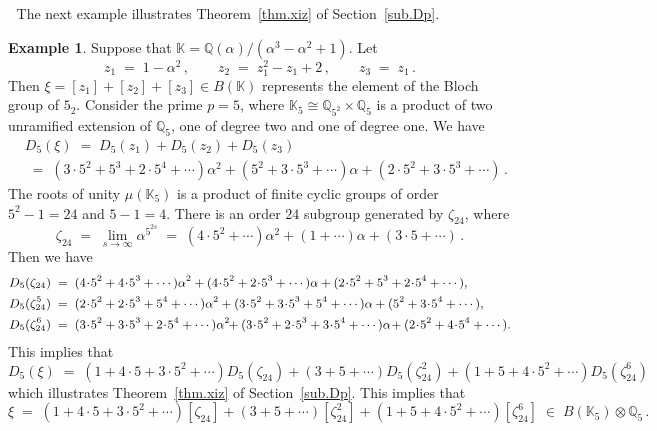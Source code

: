 \documentclass[12pt,reqno]{amsart}
\theoremstyle{definition}
\newtheorem{example}[proposition]{Example}
\def\BQ{\mathbb Q}
\def\BK{\mathbb K}
\def\a{\alpha}
\def\be{\begin{equation}}
\def\ee{\end{equation}}
\def\z{\zeta}
\def\={\;=\;}
\def\inn{\;\in\;}
\begin{document}
$\;$ The next example illustrates Theorem~\ref{thm.xiz} of Section~\ref{sub.Dp}.

\begin{example}
\label{ex.xiz1}
Suppose that $\mathbb{K}=\BQ(\alpha)/(\alpha^3-\alpha^2+1)$. Let
\be
z_1\=1-\alpha^2\,,\qquad
z_2\=z_1^2-z_1+2\,,\qquad
z_3\=z_1\,.
\ee
Then $\xi=[z_1]+[z_2]+[z_3]\in B(\mathbb{K})$ represents the element of the Bloch
group of $5_2$. Consider the prime $p=5$, where
$\mathbb{K}_{5}\cong\BQ_{5^2}\times\BQ_{5}$ is a product of two unramified extension
of $\BQ_5$, one of degree two and one of degree one. We have
\be
\begin{aligned}
&D_{5}(\xi)
\=
D_5(z_1)+D_5(z_2)+D_5(z_3) \\
& \=
(3\cdot5^2 + 5^3 + 2\cdot5^4 + \cdots)\a^2 + (5^2 + 3\cdot5^3 + \cdots)\a
+ (2\cdot5^2 + 3\cdot5^3+\cdots)\,.
\end{aligned}
\ee
The roots of unity $\mu(\mathbb{K}_{5})$ is a product of finite cyclic groups of order
$5^2-1=24$ and $5-1=4$. There is an order $24$ subgroup generated by $\z_{24}$, where
\be
\z_{24} \= \lim_{s\to\infty} \alpha^{5^{2s}} \=
(4\cdot5^2 + \cdots)\a^2 + (1 + \cdots)\a + (3\cdot5 + \cdots)\,.
\ee
Then we have
\be
\begin{small}
\begin{aligned}
D_5(\z_{24})
&\=
(4\!\cdot\! 5^2 + 4\!\cdot\! 5^3 + \cdots)\a^2 + (4\!\cdot\! 5^2 + 2\!\cdot\! 5^3
+ \cdots)\a
+ (2\!\cdot\! 5^2 + 5^3 + 2\!\cdot\! 5^4 + \cdots),\\
D_5(\z_{24}^5)
&\=
(2\!\cdot\! 5^2 + 2\!\cdot\! 5^3 + 5^4 + \cdots)\a^2
+ (3\!\cdot\! 5^2 + 3\!\cdot\! 5^3 + 5^4 + \cdots)\a + (5^2 + 3\!\cdot\! 5^4
+ \cdots),\\
D_5(\z_{24}^6)
&\=
(3\!\cdot\! 5^2 + 3\!\cdot\! 5^3 + 2\!\cdot\! 5^4 + \cdots)\a^2\!\!
+ (3\!\cdot\! 5^2 + 2\!\cdot\! 5^3
+ 3\!\cdot\! 5^4 + \cdots)\a\! + (2\!\cdot\! 5^2 + 4\!\cdot\! 5^4 + \cdots).
\end{aligned}
\end{small}
\ee
This implies that
\be
D_5(\xi)
\=
(1 + 4\cdot 5 + 3\cdot 5^2 + \cdots)D_5(\z_{24}) + (3 + 5 + \cdots)D_5(\z_{24}^2)
+ (1 + 5 + 4\cdot 5^2 + \cdots)D_5(\z_{24}^6)
\ee
which illustrates Theorem~\ref{thm.xiz} of Section~\ref{sub.Dp}. This implies that
\be
\xi \= (1 + 4\cdot 5 + 3\cdot 5^2 + \cdots)[\z_{24}] + (3 + 5 + \cdots)[\z_{24}^2]
+ (1 + 5 + 4\cdot 5^2 + \cdots)[\z_{24}^6] \inn B(\BK_5)\otimes\BQ_5 \,.
\ee
\end{example}

\end{document}
